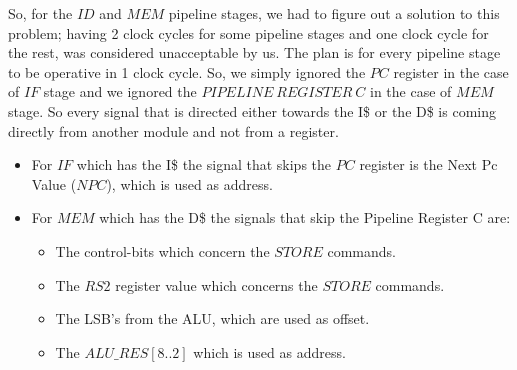 So, for the $ID$ and $MEM$ pipeline stages, we had to figure out a solution to this problem; having 2 clock cycles for some pipeline stages and one clock cycle for the rest, was considered unacceptable by us. The plan is for every pipeline stage to be operative in 1 clock cycle. So, we simply ignored the $PC$ register in the case of $IF$ stage and we ignored the $PIPELINE \ REGISTER \ C$ in the case of $MEM$ stage. So every signal that is directed either towards the I\$ or the D\$ is coming directly from another module and not from a register.

\begin{itemize}
	\item For $IF$ which has the I\$ the signal that skips the $PC$ register is the Next Pc Value ($NPC$), which is used as address.
	\item For $MEM$ which has the D\$ the signals that skip the Pipeline Register C are:
	\begin{itemize}
		\item The control-bits which concern the $STORE$ commands.
		\item The $RS2$ register value which concerns the $STORE$ commands.
		\item The LSB's from the ALU, which are used as offset.		
		\item The $ALU\_RES[8..2]$ which is used as address.
	\end{itemize}	
\end{itemize}



  	
